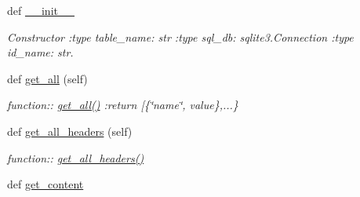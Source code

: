 \begin{DoxyCompactItemize}
\item 
def \hyperlink{classplume-creator_1_1src_1_1plume_1_1data_1_1tree_1_1tree_1_1_tree_aea7476f01e993732fd46f51e1ae3979b}{\+\_\+\+\_\+init\+\_\+\+\_\+}\hypertarget{classplume-creator_1_1src_1_1plume_1_1data_1_1tree_1_1tree_1_1_tree_aea7476f01e993732fd46f51e1ae3979b}{}\label{classplume-creator_1_1src_1_1plume_1_1data_1_1tree_1_1tree_1_1_tree_aea7476f01e993732fd46f51e1ae3979b}

\begin{DoxyCompactList}\small\item\em Constructor \+:type table\+\_\+name\+: str \+:type sql\+\_\+db\+: sqlite3.\+Connection \+:type id\+\_\+name\+: str. \end{DoxyCompactList}\item 
def \hyperlink{classplume-creator_1_1src_1_1plume_1_1data_1_1tree_1_1tree_1_1_tree_ad15162a8d8ac3e0163fcaf672d0c584f}{get\+\_\+all} (self)\hypertarget{classplume-creator_1_1src_1_1plume_1_1data_1_1tree_1_1tree_1_1_tree_ad15162a8d8ac3e0163fcaf672d0c584f}{}\label{classplume-creator_1_1src_1_1plume_1_1data_1_1tree_1_1tree_1_1_tree_ad15162a8d8ac3e0163fcaf672d0c584f}

\begin{DoxyCompactList}\small\item\em function\+:\+: \hyperlink{classplume-creator_1_1src_1_1plume_1_1data_1_1tree_1_1tree_1_1_tree_ad15162a8d8ac3e0163fcaf672d0c584f}{get\+\_\+all()} \+:return \mbox{[}\{\char`\"{}name\char`\"{}, value\},...\} \end{DoxyCompactList}\item 
def \hyperlink{classplume-creator_1_1src_1_1plume_1_1data_1_1tree_1_1tree_1_1_tree_a77ac9418cddfdaead802efafe2cc3cb2}{get\+\_\+all\+\_\+headers} (self)\hypertarget{classplume-creator_1_1src_1_1plume_1_1data_1_1tree_1_1tree_1_1_tree_a77ac9418cddfdaead802efafe2cc3cb2}{}\label{classplume-creator_1_1src_1_1plume_1_1data_1_1tree_1_1tree_1_1_tree_a77ac9418cddfdaead802efafe2cc3cb2}

\begin{DoxyCompactList}\small\item\em function\+:\+: \hyperlink{classplume-creator_1_1src_1_1plume_1_1data_1_1tree_1_1tree_1_1_tree_a77ac9418cddfdaead802efafe2cc3cb2}{get\+\_\+all\+\_\+headers()} \end{DoxyCompactList}\item 
def \hyperlink{classplume-creator_1_1src_1_1plume_1_1data_1_1tree_1_1tree_1_1_tree_a971b87650ec9060e70d720454bae3f09}{get\+\_\+content}\hypertarget{classplume-creator_1_1src_1_1plume_1_1data_1_1tree_1_1tree_1_1_tree_a971b87650ec9060e70d720454bae3f09}{}\label{classplume-creator_1_1src_1_1plume_1_1data_1_1tree_1_1tree_1_1_tree_a971b87650ec9060e70d720454bae3f09}


\end{DoxyCompactItemize}
